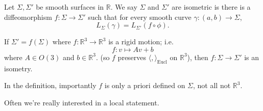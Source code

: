 \leavevmode
\begin{definition}
    Let \(\Sigma, \Sigma'\) be smooth surfaces in \(\mathbb{R}\). We say \(\Sigma\) and \(\Sigma'\) are isometric is there is a diffeomorphism \(f: \Sigma \to \Sigma'\) such that for every smooth curve \(\gamma: (a,b) \to \Sigma\),
    \[
        L_\Sigma(\gamma) = L_{\Sigma'}(f\circ \phi).
    \]
\end{definition}
\begin{example}
    If \(\Sigma' = f(\Sigma)\) where \(f: \mathbb{R}^3 \to \mathbb{R}^3\) is a rigid motion; i.e.
    \[
        f: v \longmapsto Av + b
    \]
    where \(A \in O(3)\) and \(b \in \mathbb{R}^3\). (so \(f\) preserves \(\langle,\rangle_\text{Eucl}\) on \(\mathbb{R}^3\)), then \(f: \Sigma \to \Sigma'\) is an isometry.
\end{example}
\begin{note}
    In the definition, importantly \(f\) is only a priori defined on \(\Sigma\), not all not \(\mathbb{R}^{3}\).
\end{note}
Often we're really interested in a local statement.

